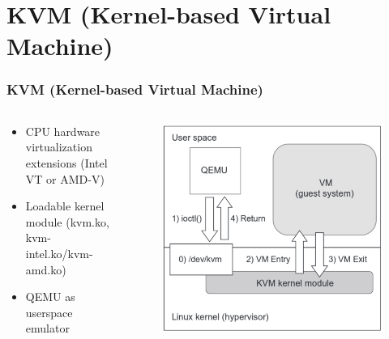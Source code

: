 \documentclass[aspectratio=169]{beamer}
\begin{document}
\section{KVM (Kernel-based Virtual Machine)}
\begin{frame}
\frametitle{KVM (Kernel-based Virtual Machine)}
\begin{columns}[c]
\begin{center}
\begin{itemize}
\item CPU hardware virtualization extensions (Intel VT or AMD-V)
\item Loadable kernel module (kvm.ko, kvm-intel.ko/kvm-amd.ko)
\item QEMU as userspace emulator
\end{itemize}
\end{center}
\begin{center}
\begin{figure}
\includegraphics[width=1.0\linewidth]{figures/kvm.pdf}
\end{figure}
\end{center}
\end{columns}
\end{frame}

\end{document}
